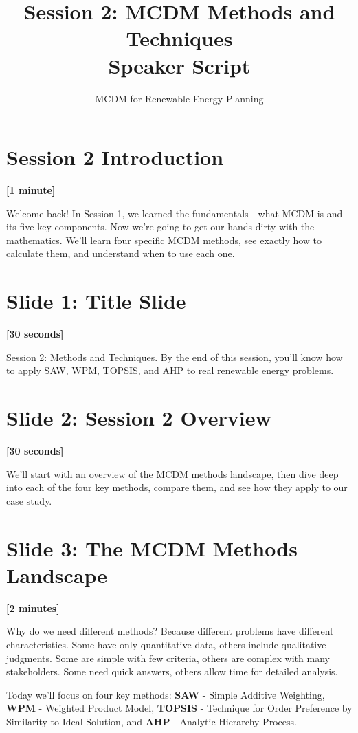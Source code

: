\documentclass[12pt]{article}
\title{Session 2: MCDM Methods and Techniques\\Speaker Script}
\author{MCDM for Renewable Energy Planning}
\date{}
\begin{document}
\maketitle

\section*{Session 2 Introduction}
\textcolor{timing}{\textbf{[1 minute]}}

Welcome back! In Session 1, we learned the fundamentals - what MCDM is and its five key components. Now we're going to get our hands dirty with the mathematics. We'll learn four specific MCDM methods, see exactly how to calculate them, and understand when to use each one.

\section*{Slide 1: Title Slide}
\textcolor{timing}{\textbf{[30 seconds]}}

Session 2: Methods and Techniques. By the end of this session, you'll know how to apply SAW, WPM, TOPSIS, and AHP to real renewable energy problems.

\section*{Slide 2: Session 2 Overview}
\textcolor{timing}{\textbf{[30 seconds]}}

We'll start with an overview of the MCDM methods landscape, then dive deep into each of the four key methods, compare them, and see how they apply to our case study.

\section*{Slide 3: The MCDM Methods Landscape}
\textcolor{timing}{\textbf{[2 minutes]}}

Why do we need different methods? Because different problems have different characteristics. Some have only quantitative data, others include qualitative judgments. Some are simple with few criteria, others are complex with many stakeholders. Some need quick answers, others allow time for detailed analysis.

Today we'll focus on four key methods: \textcolor{emphasis}{\textbf{SAW}} - Simple Additive Weighting, \textcolor{emphasis}{\textbf{WPM}} - Weighted Product Model, \textcolor{emphasis}{\textbf{TOPSIS}} - Technique for Order Preference by Similarity to Ideal Solution, and \textcolor{emphasis}{\textbf{AHP}} - Analytic Hierarchy Process.
\end{document}

